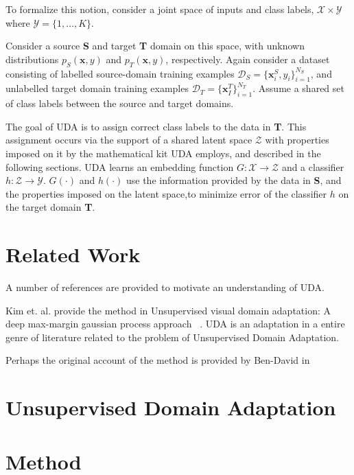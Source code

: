 \documentclass[10pt,twocolumn,letterpaper]{article}
\newcommand{\vect}[1]{\boldsymbol{\mathbf{#1}}}
\begin{document}
To formalize this notion, consider a joint space of inputs and class labels, \(\mathcal{X} \times \mathcal{Y}\) where \(\mathcal{Y} = \{1,\dots,K\}\). 

Consider a source \textbf{S} and target \textbf{T} domain on this space,  with unknown distributions \(p_S(\vect{x}, y)\) and \(p_T(\vect{x},y)\), respectively.  Again consider a dataset consisting of 
labelled source-domain training examples \(\mathcal{D}_S = \{\vect{x}_i^S, y_i\}_{i=1}^{N_S}\), and unlabelled target domain training examples \(\mathcal{D}_T = \{\vect{x}_I^T\}_{i=1}^{N_T}\).  Assume a shared set of class labels between the source and target domains. 

The goal of UDA is to assign correct class labels to the data in \textbf{T}.  This assignment occurs via the support of a shared latent space \(\mathcal{Z}\) with properties imposed on it by the  mathematical kit UDA employs, and described in the following sections.  UDA learns an embedding function \(G: \mathcal{X} \to \mathcal{Z}\) and a classifier \(h: \mathcal{Z} \to \mathcal{Y}\).   \(G(\cdot)\) and \(h(\cdot)\) use the information provided by the data in \textbf{S}, and the properties imposed on the latent space,to minimize error of the classifier \(h\) on the target domain \textbf{T}.

\section{Related Work}

A number of references are provided to motivate an understanding of UDA. 

Kim et. al. provide the method in Unsupervised visual domain adaptation: A deep max-margin gaussian process approach ~\cite{kim2019unsupervised}.  UDA is an adaptation in a entire genre of literature related to the problem of Unsupervised Domain Adaptation.  

Perhaps the original account of the method is provided by Ben-David in ~\cite{}    
 


\section{Unsupervised Domain Adaptation}


\section{Method}
\end{document}
